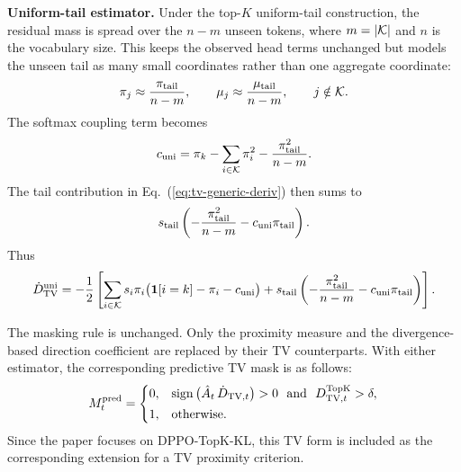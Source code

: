\noindent\textbf{Uniform-tail estimator.}
Under the top-$K$ uniform-tail construction, the residual mass is spread over the
$n-m$ unseen tokens, where $m=|\mathcal{K}|$ and $n$ is the vocabulary size.
This keeps the observed head terms unchanged but models the unseen tail as many
small coordinates rather than one aggregate coordinate:
\begin{equation}
\pi_j\approx\frac{\pi_{\mathrm{tail}}}{n-m},
\qquad
\mu_j\approx\frac{\mu_{\mathrm{tail}}}{n-m},
\qquad j\notin\mathcal{K}.
\end{equation}
The softmax coupling term becomes
\begin{equation}
 c_{\mathrm{uni}}
 =\pi_k-
 \sum_{i\in\mathcal{K}}\pi_i^2
 -\frac{\pi_{\mathrm{tail}}^2}{n-m}.
\end{equation}
The tail contribution in Eq.~(\ref{eq:tv-generic-deriv}) then sums to
\begin{equation}
 s_{\mathrm{tail}}
 \left(
 -\frac{\pi_{\mathrm{tail}}^2}{n-m}
 -c_{\mathrm{uni}}\pi_{\mathrm{tail}}
 \right).
\end{equation}
Thus
\begin{equation}
\label{eq:tv-uni-tail}
\dot{D}_{\mathrm{TV}}^{\mathrm{uni}}
=
-\frac12
\left[
\sum_{i\in\mathcal{K}}
 s_i\pi_i\big(\bm{1}[i=k]-\pi_i-c_{\mathrm{uni}}\big)
+
 s_{\mathrm{tail}}
 \left(
 -\frac{\pi_{\mathrm{tail}}^2}{n-m}
 -c_{\mathrm{uni}}\pi_{\mathrm{tail}}
 \right)
\right].
\end{equation}

The masking rule is unchanged.
Only the proximity measure and the divergence-based direction coefficient are replaced
by their TV counterparts.
With either estimator, the corresponding predictive TV mask is as follows:
\begin{equation}
M_t^{\mathrm{pred}} =
\begin{cases}
0, & \operatorname{sign}\big(\hat{A}_t\,\dot{D}_{\mathrm{TV},t}\big)>0
\ \text{ and }\ D_{\mathrm{TV},t}^{\mathrm{TopK}}>\delta,\\[2pt]
1, & \text{otherwise.}
\end{cases}
\end{equation}
Since the paper focuses on DPPO-TopK-KL, this TV form is included as the
corresponding extension for a TV proximity criterion.

